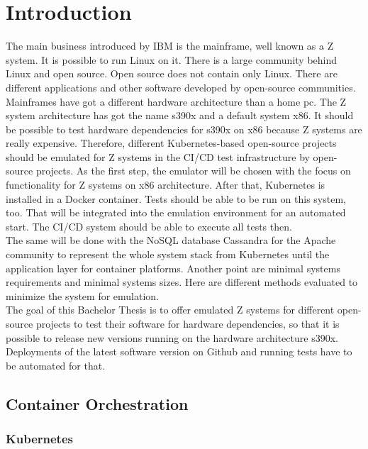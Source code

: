 \chapter{Introduction}\label{ch:intro}

The main business introduced by IBM is the mainframe, well known as a Z system. It is possible to run Linux on it. There is a large community behind Linux and open source. Open source does not contain only Linux. There are different applications and other software developed by open-source communities. Mainframes have got a different hardware architecture than a home pc. The Z system architecture has got the name s390x and a default system x86. It should be possible to test hardware dependencies for s390x on x86 because Z systems are really expensive. Therefore, different Kubernetes-based open-source projects should be emulated for Z systems in the CI/CD test infrastructure by open-source projects. As the first step, the emulator will be chosen with the focus on functionality for Z systems on x86 architecture. After that, Kubernetes is installed in a Docker container. Tests should be able to be run on this system, too. That will be integrated into the emulation environment for an automated start. The CI/CD system should be able to execute all tests then. \\
The same will be done with the NoSQL database Cassandra for the Apache community to represent the whole system stack from Kubernetes until the application layer for container platforms. Another point are minimal systems requirements and minimal systems sizes. Here are different methods evaluated to minimize the system for emulation. \\
The goal of this Bachelor Thesis is to offer emulated Z systems for different open-source projects to test their software for hardware dependencies, so that it is possible to release new versions running on the hardware architecture s390x. Deployments of the latest software version on Github and running tests have to be automated for that.

\blindtext

\section{Container Orchestration}

\blindtext

\subsection{Kubernetes}

